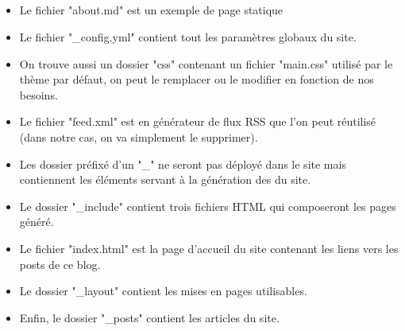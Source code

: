 \documentclass[11pt,a4paper]{report}
\begin{document}
				\subparagraph*{}
					\begin{itemize}
						\item Le fichier "about.md" est un exemple de page statique
						\item Le fichier "\_config.yml" contient tout les paramètres globaux du site.
						\item On trouve aussi un dossier "css" contenant un fichier "main.css" utilisé par le thème par défaut, on peut le remplacer ou le modifier en fonction de nos besoins.
						\item Le fichier "feed.xml" est en générateur de flux RSS que l'on peut réutilisé (dans notre cas, on va simplement le supprimer).
						\item Les dossier préfixé d'un "\_" ne seront pas déployé dans le site mais contiennent les éléments servant à la génération des du site.
						\item Le dossier "\_include" contient trois fichiers HTML qui composeront les pages généré.
						\item Le fichier "index.html" est la page d'accueil du site contenant les liens vers les posts de ce blog.
						\item Le dossier "\_layout" contient les mises en pages utilisables.
						\item Enfin, le dossier "\_posts" contient les articles du site.
					\end{itemize}
\end{document}
